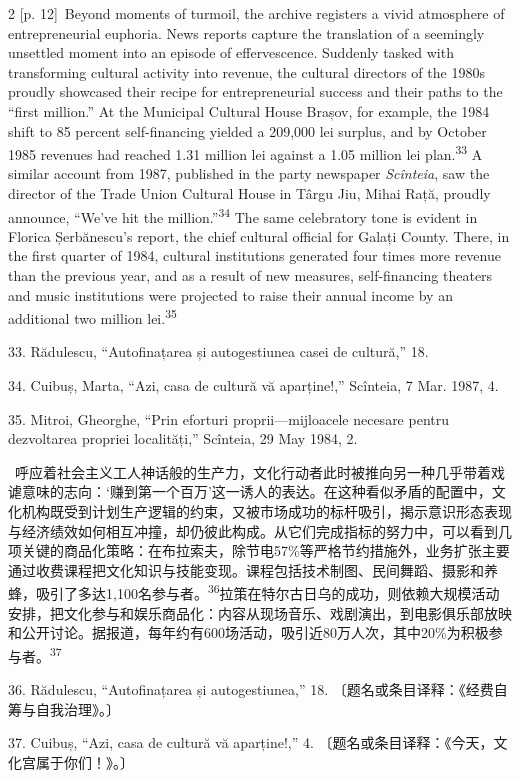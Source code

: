 \documentclass[10pt,a4paper]{article}
\begin{document}
\begin{paracol}{2}
\switchcolumn
{\scriptsize\color{gray} [p. 12]}\ Beyond moments of turmoil, the archive registers a vivid atmosphere of entrepreneurial euphoria. News reports capture the translation of a seemingly unsettled moment into an episode of effervescence. Suddenly tasked with transforming cultural activity into revenue, the cultural directors of the 1980s proudly showcased their recipe for entrepreneurial success and their paths to the “first million.” At the Municipal Cultural House Brașov, for example, the 1984 shift to 85 percent self-financing yielded a 209,000 lei surplus, and by October 1985 revenues had reached 1.31 million lei against a 1.05 million lei plan.\nobreak\textsuperscript{33} A similar account from 1987, published in the party newspaper \textit{Scînteia}, saw the director of the Trade Union Cultural House in Târgu Jiu, Mihai Rață, proudly announce, “We’ve hit the million.”\nobreak\textsuperscript{34} The same celebratory tone is evident in Florica Șerbănescu’s report, the chief cultural official for Galați County. There, in the first quarter of 1984, cultural institutions generated four times more revenue than the previous year, and as a result of new measures, self-financing theaters and music institutions were projected to raise their annual income by an additional two million lei.\nobreak\textsuperscript{35}\par{\small 33. Rădulescu, “Autofinațarea și autogestiunea casei de cultură,” 18.\par}{\small 34. Cuibuș, Marta, “Azi, casa de cultură vă aparține!,” Scînteia, 7 Mar. 1987, 4.\par}{\small 35. Mitroi, Gheorghe, “Prin eforturi proprii—mijloacele necesare pentru dezvoltarea propriei localități,” Scînteia, 29 May 1984, 2.\par}
\switchcolumn*
{\scriptsize\color{gray} [p. 12]}\ 呼应着社会主义工人神话般的生产力，文化行动者此时被推向另一种几乎带着戏谑意味的志向：‘赚到第一个百万’这一诱人的表达。在这种看似矛盾的配置中，文化机构既受到计划生产逻辑的约束，又被市场成功的标杆吸引，揭示意识形态表现与经济绩效如何相互冲撞，却仍彼此构成。从它们完成指标的努力中，可以看到几项关键的商品化策略：在布拉索夫，除节电57\%等严格节约措施外，业务扩张主要通过收费课程把文化知识与技能变现。课程包括技术制图、民间舞蹈、摄影和养蜂，吸引了多达1,100名参与\mbox{者。\textsuperscript{36}}拉策在特尔古日乌的成功，则依赖大规模活动安排，把文化参与和娱乐商品化：内容从现场音乐、戏剧演出，到电影俱乐部放映和公开讨论。据报道，每年约有600场活动，吸引近80万人次，其中20\%为积极参与\mbox{者。\textsuperscript{37}}\par{\small 36. Rădulescu, “Autofinațarea și autogestiunea,” 18. 〔题名或条目译释：《经费自筹与自我治理》。〕\par}{\small 37. Cuibuș, “Azi, casa de cultură vă aparține!,” 4. 〔题名或条目译释：《今天，文化宫属于你们！》。〕\par}

\end{paracol}
\end{document}
